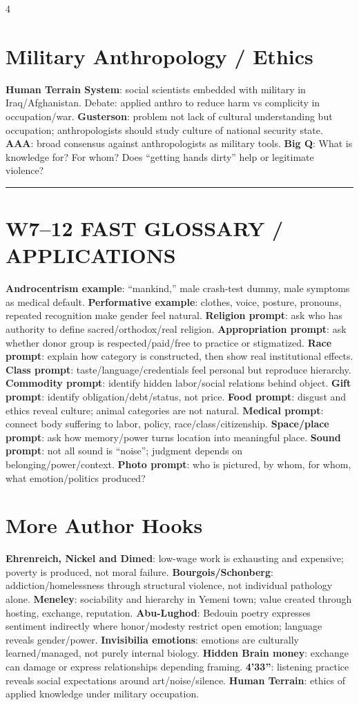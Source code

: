 \documentclass[10pt,landscape]{article}
\newcommand{\kw}[1]{\textbf{#1}}
\newcommand{\sep}{\vspace{0.8pt}\hrule\vspace{0.8pt}}
\begin{document}
\begin{multicols*}{4}
\section*{Military Anthropology / Ethics}
\kw{Human Terrain System}: social scientists embedded with military in Iraq/Afghanistan. Debate: applied anthro to reduce harm vs complicity in occupation/war. \kw{Gusterson}: problem not lack of cultural understanding but occupation; anthropologists should study culture of national security state. \kw{AAA}: broad consensus against anthropologists as military tools. \kw{Big Q}: What is knowledge for? For whom? Does ``getting hands dirty'' help or legitimate violence?


\sep
\section*{W7--12 FAST GLOSSARY / APPLICATIONS}
\kw{Androcentrism example}: ``mankind,'' male crash-test dummy, male symptoms as medical default. \kw{Performative example}: clothes, voice, posture, pronouns, repeated recognition make gender feel natural. \kw{Religion prompt}: ask who has authority to define sacred/orthodox/real religion. \kw{Appropriation prompt}: ask whether donor group is respected/paid/free to practice or stigmatized. \kw{Race prompt}: explain how category is constructed, then show real institutional effects. \kw{Class prompt}: taste/language/credentials feel personal but reproduce hierarchy. \kw{Commodity prompt}: identify hidden labor/social relations behind object. \kw{Gift prompt}: identify obligation/debt/status, not price. \kw{Food prompt}: disgust and ethics reveal culture; animal categories are not natural. \kw{Medical prompt}: connect body suffering to labor, policy, race/class/citizenship. \kw{Space/place prompt}: ask how memory/power turns location into meaningful place. \kw{Sound prompt}: not all sound is ``noise''; judgment depends on belonging/power/context. \kw{Photo prompt}: who is pictured, by whom, for whom, what emotion/politics produced?

\section*{More Author Hooks}
\kw{Ehrenreich, Nickel and Dimed}: low-wage work is exhausting and expensive; poverty is produced, not moral failure. \kw{Bourgois/Schonberg}: addiction/homelessness through structural violence, not individual pathology alone. \kw{Meneley}: sociability and hierarchy in Yemeni town; value created through hosting, exchange, reputation. \kw{Abu-Lughod}: Bedouin poetry expresses sentiment indirectly where honor/modesty restrict open emotion; language reveals gender/power. \kw{Invisibilia emotions}: emotions are culturally learned/managed, not purely internal biology. \kw{Hidden Brain money}: exchange can damage or express relationships depending framing. \kw{4'33''}: listening practice reveals social expectations around art/noise/silence. \kw{Human Terrain}: ethics of applied knowledge under military occupation.


\end{multicols*}
\end{document}
